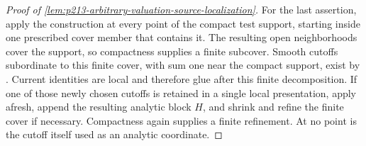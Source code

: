 \begin{proof}[Proof of
\cref{lem:p213-arbitrary-valuation-source-localization}]
For the last assertion, apply the construction at every point of the
compact test support, starting inside one prescribed cover member that
contains it.  The resulting open neighborhoods cover the support, so
compactness supplies a finite subcover.  Smooth cutoffs subordinate to this
finite cover, with sum one near the compact support, exist by
\cite[Corollary~15.2.9]{CLD25}.
Current identities are local and therefore glue after this finite
decomposition.  If one of those newly chosen cutoffs is retained in a
single local presentation, apply \cite[Corollary~15.1.2]{CLD25} afresh,
append the resulting analytic block $H$, and shrink and refine the finite
cover if necessary.  Compactness again supplies a finite refinement.  At
no point is the cutoff itself used as an analytic coordinate.
\end{proof}
